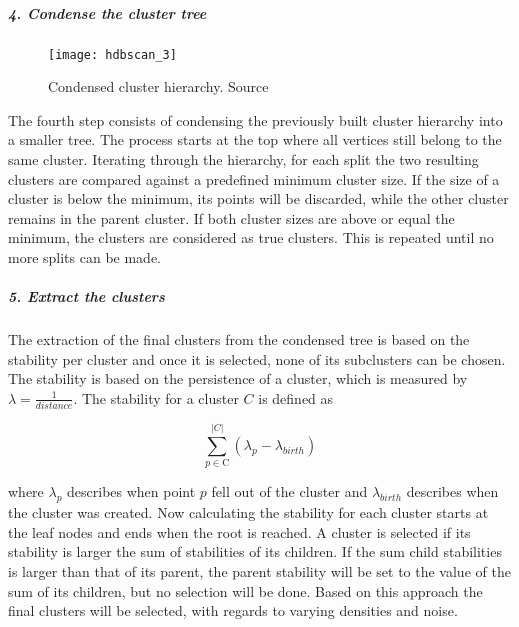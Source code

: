 \subparagraph{4. Condense the cluster tree}
\begin{figure}[h]
    \centering
    \texttt{[image: hdbscan\_3]}
    \caption{Condensed cluster hierarchy. Source\cite{how_hdbscan_works}}
    \label{fig:hdbscan_3}
\end{figure}

The fourth step consists of condensing the previously built cluster hierarchy into a smaller tree.
The process starts at the top where all vertices still belong to the same cluster.
Iterating through the hierarchy,
for each split the two resulting clusters are compared against a predefined minimum cluster size.
If the size of a cluster is below the minimum,
its points will be discarded, while the other cluster remains in the parent cluster.
If both cluster sizes are above or equal the minimum, the clusters are considered as true clusters.
This is repeated until no more splits can be made.

\subparagraph{5. Extract the clusters}
The extraction of the final clusters from the condensed tree is based on the stability per cluster
and once it is selected, none of its subclusters can be chosen.
The stability is based on the persistence of a cluster,
which is measured by $\lambda = \frac{1}{distance}$. The stability for a cluster $C$ is defined as

\begin{equation}
\sum_{p \in \text{C}}^{|C|} ({\lambda}_{p} - {\lambda}_{birth})
\end{equation}

where ${\lambda}_{p}$ describes when point $p$ fell out of the cluster and $ {\lambda}_{birth}$
describes when the cluster was created.
Now calculating the stability for each cluster starts at the leaf nodes and ends when the root is reached.
A cluster is selected if its stability is larger the sum of stabilities of its children.
If the sum child stabilities is larger than that of its parent,
the parent stability will be set to the value of the sum of its children,
but no selection will be done.
Based on this approach the final clusters will be selected, with regards to varying densities and noise.
